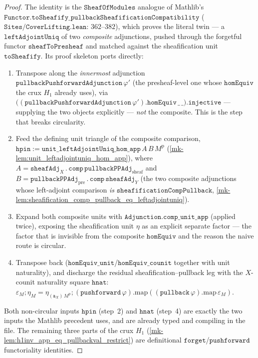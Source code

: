 \begin{proof}
  The identity is the \(\mathtt{SheafOfModules}\) analogue of Mathlib's
  \(\mathtt{Functor.toSheafify\_pullbackSheafificationCompatibility}\)
  (\(\mathtt{Sites/CoverLifting.lean}\): \(362\)--\(382\)), which proves the literal twin --- a
  \(\mathtt{leftAdjointUniq}\) of two \emph{composite} adjunctions, pushed through the forgetful functor
  \(\mathtt{sheafToPresheaf}\) and matched against the sheafification unit \(\mathtt{toSheafify}\). Its
  proof skeleton ports directly:
  \begin{enumerate}
    \item Transpose along the \emph{innermost} adjunction
      \(\mathtt{pullbackPushforwardAdjunction}\,\varphi'\) (the presheaf-level one whose
      \(\mathtt{homEquiv}\) the crux \(H_1\) already uses), via
      \(\bigl((\mathtt{pullbackPushforwardAdjunction}\,\varphi').\mathtt{homEquiv}\,\_\,\_\bigr).\mathtt{injective}\)
      --- supplying the two objects explicitly --- \emph{not} the composite. This is the step that
      breaks circularity.
    \item Feed the defining unit triangle of the composite comparison,
      \(\mathtt{hpin} := \mathtt{unit\_leftAdjointUniq\_hom\_app}\,A\,B\,M^{\mathrm p}\)
      (\ref{mk-lem:unit_leftadjointuniq_hom_app}), where
      \(A = \mathtt{sheafAdj}_X \mathbin{.}\!\mathtt{comp}\,\mathtt{pullbackPPAdj}_{\mathrm{sheaf}}\) and
      \(B = \mathtt{pullbackPPAdj}_{\mathrm{pre}} \mathbin{.}\!\mathtt{comp}\,\mathtt{sheafAdj}_Y\)
      (the two composite adjunctions whose left-adjoint comparison \emph{is}
      \(\mathtt{sheafificationCompPullback}\), \ref{mk-lem:sheafification_comp_pullback_eq_leftadjointuniq}).
    \item Expand both composite units with \(\mathtt{Adjunction.comp\_unit\_app}\) (applied twice),
      exposing the sheafification unit \(\eta\) as an explicit separate factor --- the factor that is
      invisible from the composite \(\mathtt{homEquiv}\) and the reason the naive route is circular.
    \item Transpose back (\(\mathtt{homEquiv\_unit}\)/\(\mathtt{homEquiv\_counit}\) together with unit
      naturality), and discharge the residual sheafification--pullback leg with the \(X\)-counit
      naturality square
      \(\mathtt{hnat}\): \(\varepsilon_M \mathbin{;} \eta_M
      = \eta_{(\mathtt{a}_X)\,M^{\mathrm p}} \mathbin{;} (\mathtt{pushforward}\,\varphi).\mathrm{map}
      ((\mathtt{pullback}\,\varphi).\mathrm{map}\,\varepsilon_M)\).
  \end{enumerate}
  Both non-circular inputs \(\mathtt{hpin}\) (step~2) and \(\mathtt{hnat}\) (step~4) are exactly the two
  inputs the Mathlib precedent uses, and are already typed and compiling in the file. The remaining
  three parts of the crux \(H_1\) (\ref{mk-lem:h1inv_app_eq_pullbackval_restrict}) are definitional
  \(\mathtt{forget}\)/\(\mathtt{pushforward}\) functoriality identities.
\end{proof}

